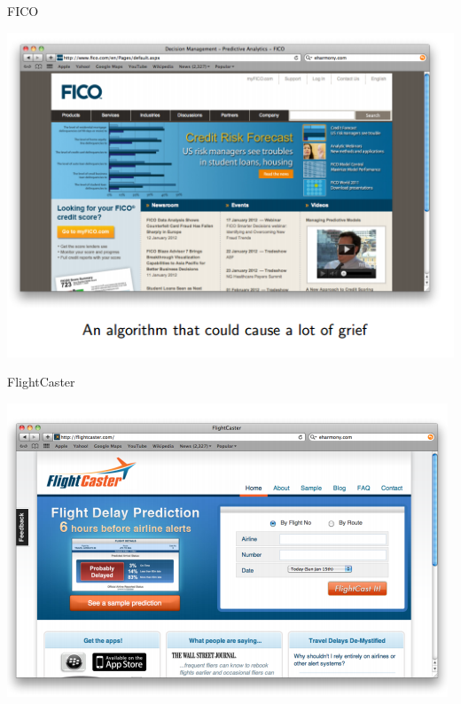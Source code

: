 \documentclass{beamer}
\begin{document}
\begin{frame}{FICO}
    \begin{center}
        \includegraphics[scale=0.5]{fico.png}
    \end{center}
\end{frame}
\begin{frame}{FlightCaster}
    \begin{center}
        \includegraphics[scale=0.5]{flightCaster.png}
    \end{center}
\end{frame}
\end{document}
